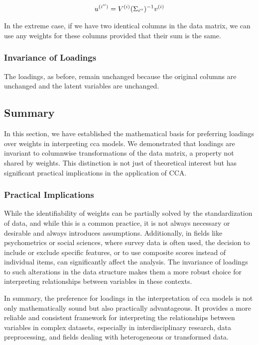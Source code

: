\begin{align}
u^{(i'')} = V^{(i)}(\Sigma_{i''})^{-1}v^{(i)} \label{eq:weights_change}
\end{align}

In the extreme case, if we have two identical columns in the data matrix, we can use any weights for these columns provided that their sum is the same.

\subsubsection{Invariance of Loadings}

The loadings, as before, remain unchanged because the original columns are unchanged and the latent variables are unchanged.

\subsection{Summary}

In this section, we have established the mathematical basis for preferring \gls{loadings} over weights in interpreting \acrshort{cca} models. We demonstrated that \gls{loadings} are invariant to columnwise transformations of the data matrix, a property not shared by weights. This distinction is not just of theoretical interest but has significant practical implications in the application of CCA.

\subsubsection{Practical Implications}

While the identifiability of weights can be partially solved by the standardization of data, and while this is a common practice, it is not always necessary or desirable and always introduces assumptions. Additionally, in fields like psychometrics or social sciences, where survey data is often used, the decision to include or exclude specific features, or to use composite scores instead of individual items, can significantly affect the analysis. The invariance of \gls{loadings} to such alterations in the data structure makes them a more robust choice for interpreting relationships between variables in these contexts.

In summary, the preference for \gls{loadings} in the interpretation of \acrshort{cca} models is not only mathematically sound but also practically advantageous. It provides a more reliable and consistent framework for interpreting the relationships between variables in complex datasets, especially in interdisciplinary research, data preprocessing, and fields dealing with heterogeneous or transformed data.

